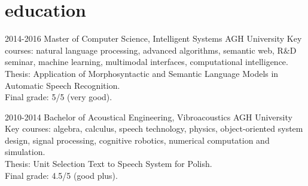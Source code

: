 \documentclass[]{friggeri-cv_osx}
\begin{document}

\begin{center}
\href{http:sebastiandziadzio.com}{\color{gray} \Large \faHome} \hspace{0.05cm}
\href{https://github.com/sebastiandziadzio}{\color{gray} \Large \faGithub} \hspace{0.05cm}
\href{mailto:sebastian.dziadzio@gmail.com}{\color{gray} \Large\faEnvelope} \hspace{0.05cm}
\href{https://twitter.com/sebadzia}{\color{gray} \Large\faTwitter} \hspace{0.05cm}
\href{http://pl.linkedin.com/in/sebastiandziadzio}{\color{gray} \Large\faLinkedin} \hspace{0.05cm}
\end{center}

\section{education}
\begin{entrylist}
\entry
{2014-2016}
{Master of Computer Science, Intelligent Systems}
{AGH University}
{Key courses: natural language processing, advanced algorithms, semantic web, R\&D seminar, machine learning, multimodal interfaces, computational intelligence.\\
Thesis: Application of Morphosyntactic and Semantic Language Models in Automatic Speech Recognition.\\
Final grade: 5/5 (very good).\\}

\entry
{2010-2014}
{Bachelor of Acoustical Engineering, Vibroacoustics}
{AGH University}
{Key courses: algebra, calculus, speech technology, physics, object-oriented system design, signal processing, cognitive robotics, numerical computation and simulation.\\
Thesis: Unit Selection Text to Speech System for Polish.\\
Final grade: 4.5/5 (good plus).\\}

\end{entrylist}
\end{document}
